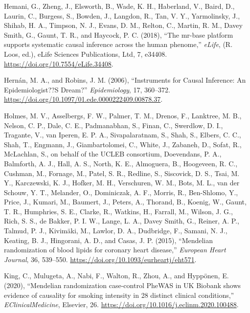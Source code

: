 \documentclass[
]{article}
\theoremstyle{plain}
\begin{document}
\leavevmode\hypertarget{ref-mrbase}{}%
Hemani, G., Zheng, J., Elsworth, B., Wade, K. H., Haberland, V., Baird, D., Laurin, C., Burgess, S., Bowden, J., Langdon, R., Tan, V. Y., Yarmolinsky, J., Shihab, H. A., Timpson, N. J., Evans, D. M., Relton, C., Martin, R. M., Davey Smith, G., Gaunt, T. R., and Haycock, P. C. (2018), ``The mr-base platform supports systematic causal inference across the human phenome,'' \emph{eLife}, (R. Loos, ed.), eLife Sciences Publications, Ltd, 7, e34408. \url{https://doi.org/10.7554/eLife.34408}.

\leavevmode\hypertarget{ref-hernan_instruments_2006}{}%
Hernán, M. A., and Robins, J. M. (2006), ``Instruments for Causal Inference: An Epidemiologist??S Dream?'' \emph{Epidemiology}, 17, 360--372. \url{https://doi.org/10.1097/01.ede.0000222409.00878.37}.

\leavevmode\hypertarget{ref-holmes_mendelian_2015}{}%
Holmes, M. V., Asselbergs, F. W., Palmer, T. M., Drenos, F., Lanktree, M. B., Nelson, C. P., Dale, C. E., Padmanabhan, S., Finan, C., Swerdlow, D. I., Tragante, V., van Iperen, E. P. A., Sivapalaratnam, S., Shah, S., Elbers, C. C., Shah, T., Engmann, J., Giambartolomei, C., White, J., Zabaneh, D., Sofat, R., McLachlan, S., on behalf of the UCLEB consortium, Doevendans, P. A., Balmforth, A. J., Hall, A. S., North, K. E., Almoguera, B., Hoogeveen, R. C., Cushman, M., Fornage, M., Patel, S. R., Redline, S., Siscovick, D. S., Tsai, M. Y., Karczewski, K. J., Hofker, M. H., Verschuren, W. M., Bots, M. L., van der Schouw, Y. T., Melander, O., Dominiczak, A. F., Morris, R., Ben-Shlomo, Y., Price, J., Kumari, M., Baumert, J., Peters, A., Thorand, B., Koenig, W., Gaunt, T. R., Humphries, S. E., Clarke, R., Watkins, H., Farrall, M., Wilson, J. G., Rich, S. S., de Bakker, P. I. W., Lange, L. A., Davey Smith, G., Reiner, A. P., Talmud, P. J., Kivimäki, M., Lawlor, D. A., Dudbridge, F., Samani, N. J., Keating, B. J., Hingorani, A. D., and Casas, J. P. (2015), ``Mendelian randomization of blood lipids for coronary heart disease,'' \emph{European Heart Journal}, 36, 539--550. \url{https://doi.org/10.1093/eurheartj/eht571}.

\leavevmode\hypertarget{ref-king_mendelian_2020}{}%
King, C., Mulugeta, A., Nabi, F., Walton, R., Zhou, A., and Hyppönen, E. (2020), ``Mendelian randomization case-control PheWAS in UK Biobank shows evidence of causality for smoking intensity in 28 distinct clinical conditions,'' \emph{EClinicalMedicine}, Elsevier, 26. \url{https://doi.org/10.1016/j.eclinm.2020.100488}.
\end{document}

